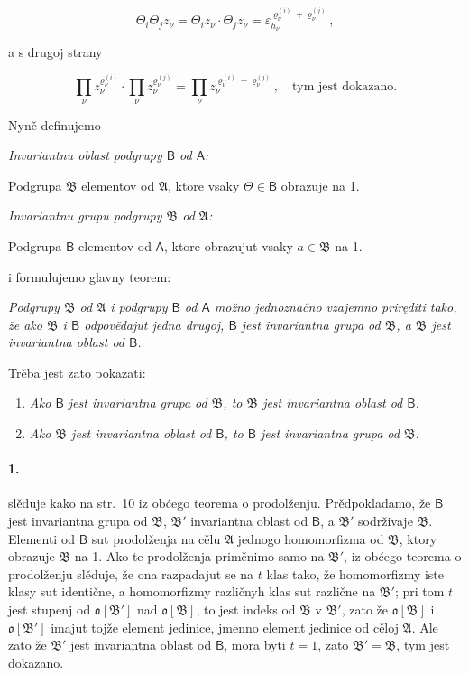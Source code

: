 \documentclass[11pt]{article}
\begin{document}
\[
\Theta_i\Theta_j z_\nu=\Theta_i z_\nu\cdot \Theta_j z_\nu
=\varepsilon_{h_\nu}^{\varrho_\nu^{(i)}+\varrho_\nu^{(j)}},
\]

a s drugoj strany

\[
\prod_\nu z_\nu^{\varrho_\nu^{(i)}}\cdot
\prod_\nu z_\nu^{\varrho_\nu^{(j)}}=
\prod_\nu z_\nu^{\varrho_\nu^{(i)}+\varrho_\nu^{(j)}},
\quad\text{tym jest dokazano.}
\]

Nyně definujemo

\emph{Invariantnu oblast podgrupy \(\mathsf B\) od \(\mathsf A\):}

Podgrupa \(\mathfrak B\) elementov od \(\mathfrak A\), ktore vsaky \(\Theta\in\mathsf B\) obrazuje na 1.

\emph{Invariantnu grupu podgrupy \(\mathfrak B\) od \(\mathfrak A\):}

Podgrupa \(\mathsf B\) elementov od \(\mathsf A\), ktore obrazujut vsaky \(a\in\mathfrak B\) na 1.

i formulujemo glavny teorem:

\emph{Podgrupy \(\mathfrak B\) od \(\mathfrak A\) i podgrupy \(\mathsf B\) od \(\mathsf A\) možno jednoznačno vzajemno priręditi tako, že ako \(\mathfrak B\) i \(\mathsf B\) odpovědajut jedna drugoj, \(\mathsf B\) jest invariantna grupa od \(\mathfrak B\), a \(\mathfrak B\) jest invariantna oblast od \(\mathsf B\).}

Trěba jest zato pokazati:

\begin{enumerate}
\item \emph{Ako \(\mathsf B\) jest invariantna grupa od \(\mathfrak B\), to \(\mathfrak B\) jest invariantna oblast od \(\mathsf B\).}
\item \emph{Ako \(\mathfrak B\) jest invariantna oblast od \(\mathsf B\), to \(\mathsf B\) jest invariantna grupa od \(\mathfrak B\).}
\end{enumerate}

\paragraph{1.}
slěduje kako na str.~10 iz obćego teorema o prodolženju. Prědpokladamo, že \(\mathsf B\) jest invariantna grupa od \(\mathfrak B\), \(\mathfrak B'\) invariantna oblast od \(\mathsf B\), a \(\mathfrak B'\) sodrživaje \(\mathfrak B\). Elementi od \(\mathsf B\) sut prodolženja na cělu \(\mathfrak A\) jednogo homomorfizma od \(\mathfrak B\), ktory obrazuje \(\mathfrak B\) na 1. Ako te prodolženja priměnimo samo na \(\mathfrak B'\), iz obćego teorema o prodolženju slěduje, že ona razpadajut se na \(t\) klas tako, že homomorfizmy iste klasy sut identične, a homomorfizmy različnyh klas sut različne na \(\mathfrak B'\); pri tom \(t\) jest stupenj od \(\mathfrak o[\mathfrak B']\) nad \(\mathfrak o[\mathfrak B]\), to jest indeks od \(\mathfrak B\) v \(\mathfrak B'\), zato že \(\mathfrak o[\mathfrak B]\) i \(\mathfrak o[\mathfrak B']\) imajut tojže element jedinice, jmenno element jedinice od cěloj \(\mathfrak A\). Ale zato že \(\mathfrak B'\) jest invariantna oblast od \(\mathsf B\), mora byti \(t=1\), zato \(\mathfrak B'=\mathfrak B\), tym jest dokazano.
\end{document}
